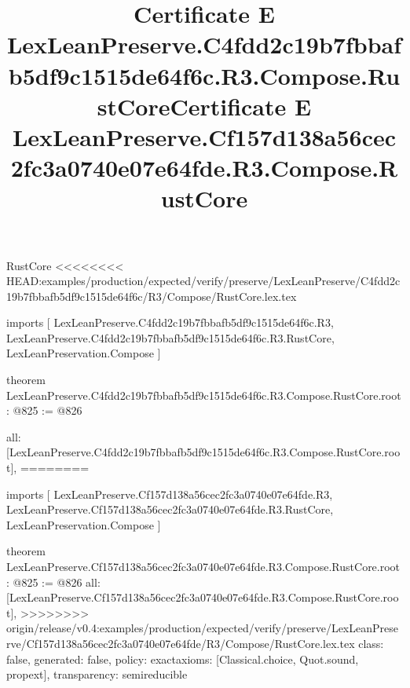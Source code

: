 \begin{lexlean}{RustCore}
<<<<<<<< HEAD:examples/production/expected/verify/preserve/LexLeanPreserve/C4fdd2c19b7fbbafb5df9c1515de64f6c/R3/Compose/RustCore.lex.tex
\title{Certificate E LexLeanPreserve.C4fdd2c19b7fbbafb5df9c1515de64f6c.R3.Compose.RustCore}
\begin{coremodule}
imports [
  LexLeanPreserve.C4fdd2c19b7fbbafb5df9c1515de64f6c.R3,
  LexLeanPreserve.C4fdd2c19b7fbbafb5df9c1515de64f6c.R3.RustCore,
  LexLeanPreservation.Compose
]

theorem LexLeanPreserve.C4fdd2c19b7fbbafb5df9c1515de64f6c.R3.Compose.RustCore.root : @825 := @826 {
  all: [LexLeanPreserve.C4fdd2c19b7fbbafb5df9c1515de64f6c.R3.Compose.RustCore.root],
========
\title{Certificate E LexLeanPreserve.Cf157d138a56cec2fc3a0740e07e64fde.R3.Compose.RustCore}
\begin{coremodule}
imports [
  LexLeanPreserve.Cf157d138a56cec2fc3a0740e07e64fde.R3,
  LexLeanPreserve.Cf157d138a56cec2fc3a0740e07e64fde.R3.RustCore,
  LexLeanPreservation.Compose
]

theorem LexLeanPreserve.Cf157d138a56cec2fc3a0740e07e64fde.R3.Compose.RustCore.root : @825 := @826 {
  all: [LexLeanPreserve.Cf157d138a56cec2fc3a0740e07e64fde.R3.Compose.RustCore.root],
>>>>>>>> origin/release/v0.4:examples/production/expected/verify/preserve/LexLeanPreserve/Cf157d138a56cec2fc3a0740e07e64fde/R3/Compose/RustCore.lex.tex
  class: false,
  generated: false,
  policy: exact{axioms: [Classical.choice, Quot.sound, propext]},
  transparency: semireducible
}


\end{coremodule}}
\end{coremodule}
\end{lexlean}

